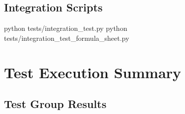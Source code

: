 \documentclass[11pt]{article}
\begin{document}
\subsection{Integration Scripts}

\begin{shellcode}
python tests/integration_test.py
python tests/integration_test_formula_sheet.py
\end{shellcode}

\section{Test Execution Summary}

\subsection{Test Group Results}
\end{document}
